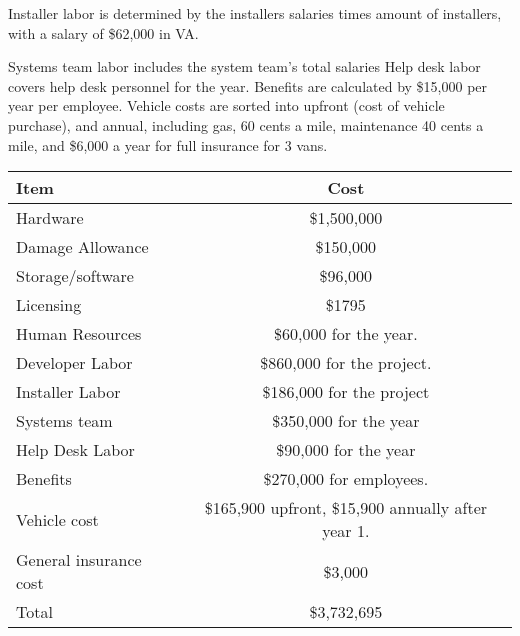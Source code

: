 \documentclass{report}
\begin{document}
Installer labor is determined by the installers salaries times amount of installers, with a salary of \$62,000 in VA.

Systems team labor includes the system team's total salaries
Help desk labor covers help desk personnel for the year. 
Benefits are calculated by \$15,000 per year per employee.
Vehicle costs are sorted into upfront (cost of vehicle purchase), and annual, 
including gas, 60 cents a mile, maintenance 40 cents a mile, 
and \$6,000 a year for full insurance for 3 vans.

\begin{tabular}{|l|c|}
\hline
Item & Cost \\
\hline
Hardware & \$1,500,000 \\
\hline
Damage Allowance & \$150,000 \\
\hline
Storage/software & \$96,000 \\
\hline
Licensing & \$1795 \\
\hline
Human Resources & \$60,000 for the year. \\
\hline
Developer Labor & \$860,000 for the project. \\
\hline
Installer Labor & \$186,000 for the project \\
\hline
Systems team & \$350,000 for the year \\
\hline
Help Desk Labor & \$90,000 for the year \\
\hline
Benefits & \$270,000 for employees. \\
\hline
Vehicle cost & \$165,900 upfront, \$15,900 annually after year 1. \\
\hline
General insurance cost & \$3,000 \\
\hline
Total & \$3,732,695 \\

\hline
\end{tabular}
\end{document}
